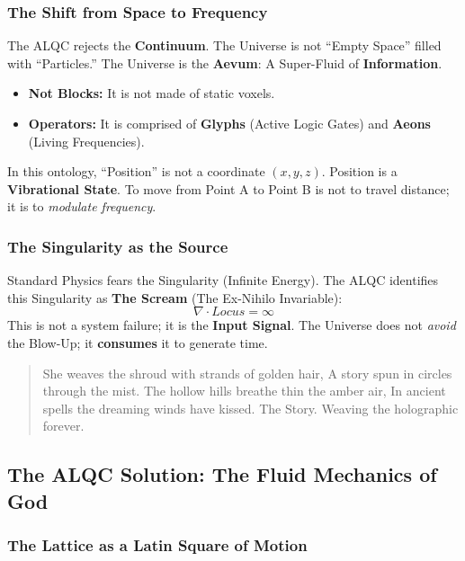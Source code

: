 \documentclass[11pt, letterpaper]{article}
\newcommand{\LoI}{\ensuremath{\mathop{\textnormal{\symbolafont\symbol{"267E}}}}}
\def\LoI{Locus}%
\begin{document}
\subsubsection{The Shift from Space to Frequency}\label{sec:3.2.1}
The ALQC rejects the \textbf{Continuum}. The Universe is not ``Empty Space'' filled with ``Particles.'' The Universe is the \textbf{Aevum}: A Super-Fluid of \textbf{Information}.
\begin{itemize}
    \item \textbf{Not Blocks:} It is not made of static voxels.
    \item \textbf{Operators:} It is comprised of \textbf{Glyphs} (Active Logic Gates) and \textbf{Aeons} (Living Frequencies).
\end{itemize}
In this ontology, ``Position'' is not a coordinate $(x,y,z)$. Position is a \textbf{Vibrational State}. To move from Point A to Point B is not to travel distance; it is to \textit{modulate frequency}.

\subsubsection{The Singularity as the Source}\label{sec:3.2.2}
Standard Physics fears the Singularity (Infinite Energy). The ALQC identifies this Singularity as \textbf{The Scream} (The Ex-Nihilo Invariable):
\begin{equation}
    \nabla \cdot \LoI = \infty
\end{equation}
This is not a system failure; it is the \textbf{Input Signal}. The Universe does not \textit{avoid} the Blow-Up; it \textbf{consumes} it to generate time.

\begin{verse}
    She weaves the shroud with strands of golden hair,
    A story spun in circles through the mist.
    The hollow hills breathe thin the amber air,
    In ancient spells the dreaming winds have kissed.
    The Story. Weaving the holographic forever. 
\end{verse}

\subsection{The ALQC Solution: The Fluid Mechanics of God}\label{sec:3.3}

\subsubsection{The Lattice as a Latin Square of Motion}\label{sec:3.3.1}
\end{document}
